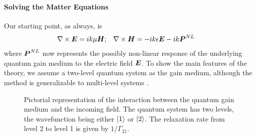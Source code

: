 \paragraph{Solving the Matter Equations}
Our starting point, as always, is
  \begin{align}
   \nabla\times\boldsymbol{E}	&= ik\mu\boldsymbol{H};	&	\nabla\times\boldsymbol{H}	&= -ik\epsilon\boldsymbol{E}-ik\boldsymbol{P}^{NL}
  \end{align}
where $\boldsymbol{P}^{NL}$ now represents the possibly non-linear response
of the underlying quantum gain medium to the electric field $\boldsymbol{E}$.
To show the main features of the theory, we assume a two-level quantum 
system as the gain medium, although the method is generalizable to 
multi-level systems \cite[\S2.3]{GE2010b}. 

\begin{figure}
 \begin{center}
 \end{center}
 \caption[Pictorial representation of the quantum gain medium]
	 {Pictorial representation of the interaction between the
	 quantum gain medium and the incoming field. The quantum system has 
	 two levels, the wavefunction being either $\Ket{1}$ or $\Ket{2}$. The relaxation
	 rate from level 2 to level 1 is given by $1/\Gamma_{21}$.}
 \label{fig:active.salt.twoLevelSystem}
\end{figure}

